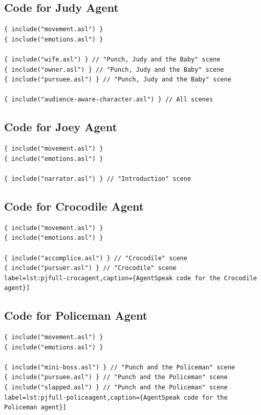 \documentclass[11pt]{report}
\begin{document}
\subsection{Code for Judy Agent}
\begin{lstlisting}[showstringspaces=false,
label=lst:pjfull-judyagent,caption={AgentSpeak code for the Judy agent}]
{ include("movement.asl") }
{ include("emotions.asl") }

{ include("wife.asl") } // "Punch, Judy and the Baby" scene
{ include("owner.asl") } // "Punch, Judy and the Baby" scene
{ include("pursuee.asl") } // "Punch, Judy and the Baby" scene

{ include("audience-aware-character.asl") } // All scenes
\end{lstlisting}

\subsection{Code for Joey Agent}
\begin{lstlisting}[showstringspaces=false,
label=lst:pjfull-joeyagent,caption={AgentSpeak code for the Joey agent}]
{ include("movement.asl") }
{ include("emotions.asl") }

{ include("narrator.asl") } // "Introduction" scene
\end{lstlisting}

\subsection{Code for Crocodile Agent}
\begin{lstlisting}[showstringspaces=false,
label=lst:pjfull-crocagent,caption={AgentSpeak code for the Crocodile agent}]
{ include("movement.asl") }
{ include("emotions.asl") }

{ include("accomplice.asl") } // "Crocodile" scene
{ include("pursuer.asl") } // "Crocodile" scene
label=lst:pjfull-crocagent,caption={AgentSpeak code for the Crocodile agent}]
\end{lstlisting}

\subsection{Code for Policeman Agent}
\begin{lstlisting}[showstringspaces=false,
label=lst:pjfull-policeagent,caption={AgentSpeak code for the Policeman agent}]
{ include("movement.asl") }
{ include("emotions.asl") }

{ include("mini-boss.asl") } // "Punch and the Policeman" scene
{ include("pursuee.asl") } // "Punch and the Policeman" scene
{ include("slapped.asl") } // "Punch and the Policeman" scene
label=lst:pjfull-policeagent,caption={AgentSpeak code for the Policeman agent}]
\end{lstlisting}
\end{document}
